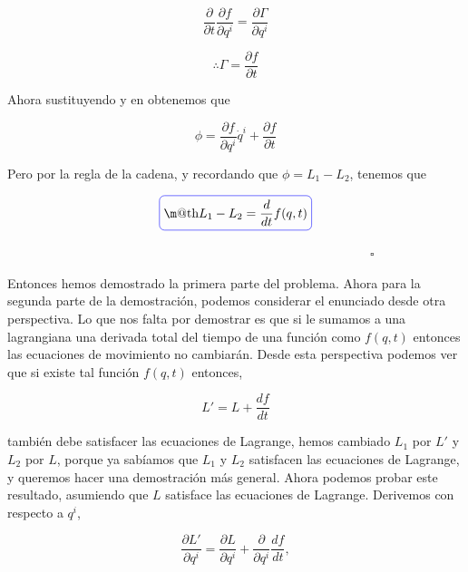 \documentclass[a4paper,10pt]{article}
\makeatletter
\numberwithin{equation}{section}
\newcommand*{\boxcolor}{blue}
\renewcommand{\boxed}[1]{\textcolor{\boxcolor}{%
\tikz[baseline={([yshift=-1ex]current bounding box.center)}] \node [rectangle, minimum width=1ex,rounded corners,draw] {\normalcolor\m@th$\displaystyle#1$};}}
\makeatother
\begin{document}
\begin{equation}
 \frac{\partial}{\partial t}\frac{\partial f}{\partial q^i} = \frac{\partial \Gamma}{\partial q^i}
\end{equation}

\begin{equation}
 \therefore \Gamma = \frac{\partial f}{\partial t}
 \label{eq:4gamma}
\end{equation}

Ahora sustituyendo  y  en  obtenemos que 

\begin{equation}
 \phi = \frac{\partial f}{\partial q^i}\dot{q}^i + \frac{\partial f}{\partial t}
\end{equation}

Pero por la regla de la cadena, y recordando que $\phi = L_1 - L_2$, tenemos que

\begin{equation}
 \boxed{L_1 - L_2 = \frac{d}{dt}f(q,t)}
\end{equation}

\vspace{.2cm} $\hspace{12cm} \square$

Entonces hemos demostrado la primera parte del problema. Ahora para la segunda parte 
de la demostración, podemos considerar el enunciado desde otra perspectiva. Lo que 
nos falta por demostrar es que si le sumamos a una lagrangiana una derivada total del tiempo
de una función como $f(q,t)$ entonces las ecuaciones de movimiento no cambiarán. Desde 
esta perspectiva podemos ver que si existe tal función $f(q,t)$ entonces,

\begin{equation}
 L' = L + \frac{df}{dt}
 \label{eq:4part1}
\end{equation}

también debe satisfacer las ecuaciones de Lagrange, hemos cambiado $L_1$ por $L'$ y 
$L_2$ por $L$, porque ya sabíamos que $L_1$ y $L_2$ satisfacen las ecuaciones de Lagrange, y
queremos hacer una demostración más general. Ahora podemos probar este resultado, asumiendo que 
$L$ satisface las ecuaciones de Lagrange. Derivemos  con respecto a $q^i$,

\begin{equation}
 \frac{\partial L'}{\partial q^i} = \frac{\partial L}{\partial q^i} + 
 \frac{\partial}{\partial q^i} \frac{df}{dt},
 \label{eq:4part2}
\end{equation}
\end{document}
